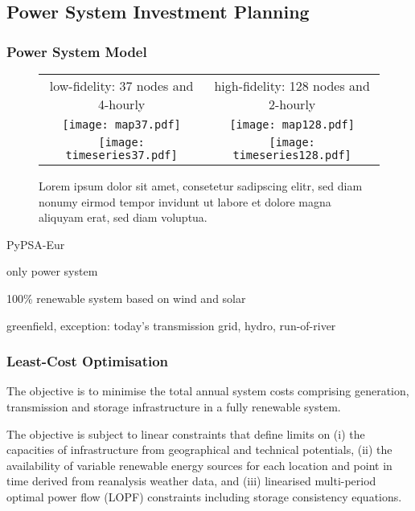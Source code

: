 \subsection{Power System Investment Planning}
\label{sec:model}

\subsubsection{Power System Model}


\begin{SCfigure}
    \begin{tabular}{cc}
        \footnotesize low-fidelity: 37 nodes and 4-hourly & \footnotesize high-fidelity: 128 nodes and 2-hourly \\
        \texttt{[image: map37.pdf]} &
        \texttt{[image: map128.pdf]} \\
        \texttt{[image: timeseries37.pdf]} &
        \texttt{[image: timeseries128.pdf]} \\
    \end{tabular}
    \caption{Lorem ipsum dolor sit amet, consetetur sadipscing elitr, sed diam nonumy eirmod tempor invidunt ut labore et dolore magna aliquyam erat, sed diam voluptua.}
\end{SCfigure}

PyPSA-Eur \cite{pypsa} \cite{pypsaeur} \cite{hoersch_spatial_2017} \cite{snakemake}

only power system

100\% renewable system based on wind and solar

greenfield, exception: today's transmission grid, hydro, run-of-river


\subsubsection{Least-Cost Optimisation}

The objective is to minimise the total annual system costs comprising generation, transmission and storage infrastructure in a fully renewable system.

The objective is subject to linear constraints that define limits on (i) the capacities of infrastructure from geographical and technical potentials, (ii) the availability of variable renewable energy sources for each location and point in time derived from reanalysis weather data, and (iii) linearised multi-period optimal power flow (LOPF) constraints including storage consistency equations.



